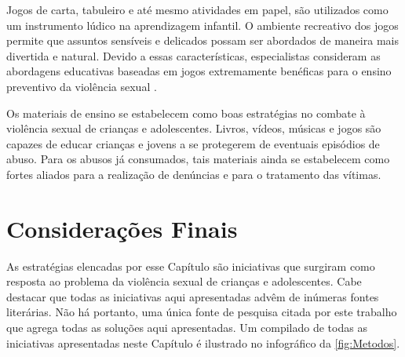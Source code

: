 Jogos de carta, tabuleiro e até mesmo atividades em papel, são utilizados como um instrumento lúdico na aprendizagem infantil. O ambiente recreativo dos jogos permite que assuntos sensíveis e delicados possam ser abordados de maneira mais divertida e natural. Devido a essas características, especialistas consideram as abordagens educativas baseadas em jogos extremamente benéficas para o ensino preventivo da violência sexual \cite{meyer2017analise}.


Os materiais de ensino se estabelecem como boas estratégias no combate à violência sexual de crianças e adolescentes. Livros, vídeos, músicas e jogos são capazes de educar crianças e jovens a se protegerem de eventuais episódios de abuso. Para os abusos já consumados, tais materiais ainda se estabelecem como fortes aliados para a realização de denúncias e para o tratamento das vítimas. 


\section{Considerações Finais}\label{sec:finais}

As estratégias elencadas por esse Capítulo são iniciativas que surgiram como resposta ao problema da violência sexual de crianças e adolescentes. Cabe destacar que todas as iniciativas aqui apresentadas advêm de inúmeras fontes literárias. Não há portanto, uma única fonte de pesquisa citada por este trabalho que agrega todas as soluções aqui apresentadas. Um compilado de todas as iniciativas apresentadas neste Capítulo é ilustrado no infográfico da \autoref{fig:Metodos}.

\vspace{0.5cm}

